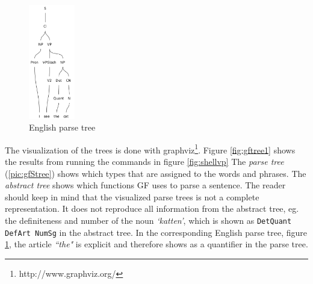 \documentclass{report}
\begin{document}
\begin{figure}
\includegraphics[width=20mm]{gfETree.png}
\caption{English parse tree}
\label{pic:gfEtree}
\end{figure}
The visualization of the trees is done with graphviz\footnote{http://www.graphviz.org/}.
Figure \ref{fig:gftree1} shows the results from running the commands in figure \ref{fig:shellvp}
The \textit{parse tree} (\ref{pic:gfStree}) shows which types
that are assigned to the words and phrases. 
The \textit{abstract tree} shows which functions GF uses
to parse a sentence.
The reader should keep in mind that the visualized parse trees is not a
complete representation. It does not reproduce all information from the abstract tree,
eg. the definiteness and number of the noun \emph{`katten'}, which is shown as
\verb-DetQuant DefArt NumSg- in the abstract tree.
In the corresponding English parse tree, figure \ref{pic:gfEtree},
the article \emph{``the"} is explicit and therefore shows as a quantifier in the parse tree.\\

\end{document}
